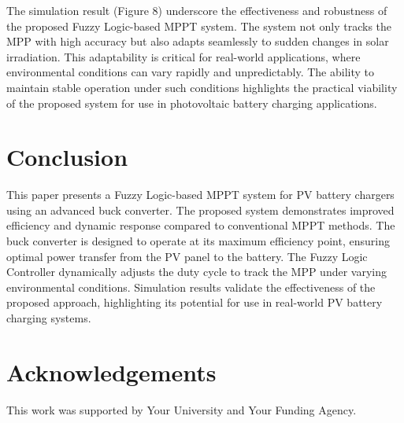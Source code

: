 \documentclass[conference]{IEEEtran}
\begin{document}
The simulation result (Figure 8) underscore the effectiveness and robustness of the proposed Fuzzy Logic-based MPPT system. The system not only tracks the MPP with high accuracy but also adapts seamlessly to sudden changes in solar irradiation. This adaptability is critical for real-world applications, where environmental conditions can vary rapidly and unpredictably. The ability to maintain stable operation under such conditions highlights the practical viability of the proposed system for use in photovoltaic battery charging applications.

\section{Conclusion}
This paper presents a Fuzzy Logic-based MPPT system for PV battery chargers using an advanced buck converter. The proposed system demonstrates improved efficiency and dynamic response compared to conventional MPPT methods. The buck converter is designed to operate at its maximum efficiency point, ensuring optimal power transfer from the PV panel to the battery. The Fuzzy Logic Controller dynamically adjusts the duty cycle to track the MPP under varying environmental conditions. Simulation results validate the effectiveness of the proposed approach, highlighting its potential for use in real-world PV battery charging systems.

\section*{Acknowledgements}
This work was supported by Your University and Your Funding Agency.
\end{document}
